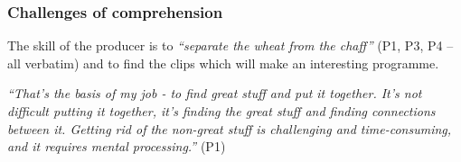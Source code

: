




\subsubsection{Challenges of comprehension}

The skill of the producer is to \textit{``separate the wheat from the chaff''} (P1, P3, P4 -- all verbatim) and to find
the clips which will make an interesting programme.

\textit{``That's the basis of my job - to find great stuff and put it together.
  It's not difficult putting it together, it's finding the great stuff and finding connections between it. Getting rid
  of the non-great stuff is
  challenging and time-consuming, and it requires mental processing.''} (P1)

